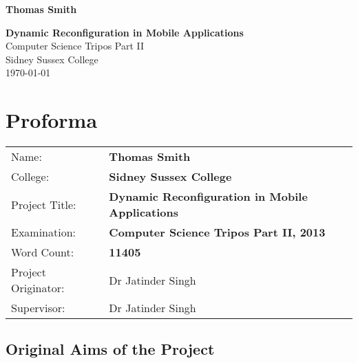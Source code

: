 \documentclass[12pt,twoside,notitlepage]{report}
\newcommand{\disstitle}{Dynamic Reconfiguration in Mobile Applications}
\newcommand{\wordcount}{11405}
\begin{document}





\pagestyle{empty}

\hfill{\LARGE \bf Thomas Smith}

\vspace*{60mm}
\begin{center}
\Huge
{\bf \disstitle} \\
\vspace*{5mm}
Computer Science Tripos Part II \\
\vspace*{5mm}
Sidney Sussex College \\
\vspace*{5mm}
\today  %
\end{center}

\cleardoublepage


\setcounter{page}{1}
\pagestyle{plain}

\chapter*{Proforma}

{\large
\begin{tabular}{l p{9.5cm}}
Name:               & \bf Thomas Smith	\\
College:            & \bf Sidney Sussex College	\\
Project Title:      & \bf \disstitle	\\
Examination:        & \bf Computer Science Tripos Part II, 2013 	\\
Word Count:         & \bf\wordcount\footnotemark[1] \\
Project Originator: & Dr Jatinder Singh		\\
Supervisor:         & Dr Jatinder Singh		\\ 
\end{tabular}
}



\section*{Original Aims of the Project}
\end{document}
